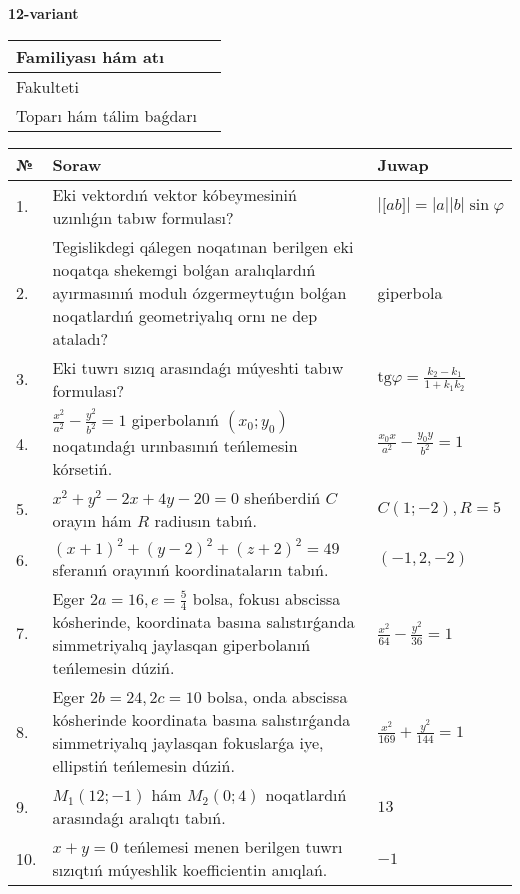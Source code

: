 \documentclass{article}
\begin{document}
\egroup

\newpage


\textbf{12-variant}\\

\bgroup
\def\arraystretch{1.6} %

\begin{tabular}{|m{5.7cm}|m{9.5cm}|}
\hline
Familiyası hám atı & \\
\hline
Fakulteti  & \\
\hline
Toparı hám tálim baǵdarı  & \\
\hline
\end{tabular}

\vspace{1cm}

\begin{tabular}{|m{0.7cm}|m{10cm}|m{4cm}|}
\hline
№ & Soraw & Juwap \\
\hline
1. & Eki vektordıń vektor kóbeymesiniń uzınlıǵın tabıw formulası? & $\left| \lbrack ab\rbrack \right|=|a||b|\sin\varphi$ \\
\hline
2. & Tegislikdegi qálegen noqatınan berilgen eki noqatqa shekemgi bolǵan aralıqlardıń ayırmasınıń modulı ózgermeytuǵın bolǵan noqatlardıń geometriyalıq ornı ne dep ataladı? & giperbola \\
\hline
3. & Eki tuwrı sızıq arasındaǵı múyeshti tabıw formulası? & $\text{tg}\varphi=\frac{k_2-k_1}{1+k_1k_2}$ \\
\hline
4. & $\frac{x^2}{a^2}-\frac{y^2}{b^2}=1$ giperbolanıń $(x_0;y_0)$ noqatındaǵı urınbasınıń teńlemesin kórsetiń. & $\frac{x_0x}{a^2}-\frac{y_0y}{b^2}=1$ \\
\hline
5. & $x^{2}+y^{2}-2x+4y-20=0$ sheńberdiń $C$ orayın hám $R$ radiusın tabıń. & $C(1;-2), R=5$ \\
\hline
6. & $(x+1)^{2}+(y-2) ^{2}+(z+2) ^{2}=49$ sferanıń orayınıń koordinataların tabıń. & $(-1,2,-2)$ \\
\hline
7. & Eger $2a=16, e=\frac{5}{4}$ bolsa, fokusı abscissa kósherinde, koordinata basına salıstırǵanda simmetriyalıq jaylasqan giperbolanıń teńlemesin dúziń. & $\frac{x^{2}}{64}-\frac{y^{2}}{36}=1$ \\
\hline
8. & Eger $2b=24, 2 c=10$ bolsa, onda abscissa kósherinde koordinata basına salıstırǵanda simmetriyalıq jaylasqan fokuslarǵa iye, ellipstiń teńlemesin dúziń. & $\frac{x^{2}}{169}+\frac{y^{2}}{144}=1$ \\
\hline
9. & $M_{1} (12;-1)$ hám $M_{2} (0;4)$ noqatlardıń arasındaǵı aralıqtı tabıń. & $13$ \\
\hline
10. & $x+y=0$ teńlemesi menen berilgen tuwrı sızıqtıń múyeshlik koefficientin anıqlań. & $- 1$ \\
\hline
\end{tabular}
\end{document}
